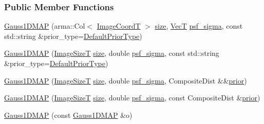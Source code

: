 \subsubsection*{Public Member Functions}
\begin{DoxyCompactItemize}
\item 
\hyperlink{classmappel_1_1Gauss1DMAP_adc8315bd2896d39cd11627555ce81ffa}{Gauss1\+D\+M\+AP} (arma\+::\+Col$<$ \hyperlink{classmappel_1_1ImageFormat1DBase_a82ab3168eb1a87eaeb3e7c919188e9fc}{Image\+CoordT} $>$ \hyperlink{classmappel_1_1ImageFormat1DBase_a8941b4d028e4dd881146a7c1b9039bb1}{size}, \hyperlink{namespacemappel_a2225ad69f358daa3f4f99282a35b9a3a}{VecT} \hyperlink{classmappel_1_1Gauss1DModel_a62c6b2a5d8ab5f5596504a19daed66b2}{psf\+\_\+sigma}, const std\+::string \&prior\+\_\+type=\hyperlink{classmappel_1_1Gauss1DModel_a4186ce131a5cc9a451ecc0011e4e6682}{Default\+Prior\+Type})
\item 
\hyperlink{classmappel_1_1Gauss1DMAP_a9284ca87695b215ee09c5fdd2d0ebcfe}{Gauss1\+D\+M\+AP} (\hyperlink{classmappel_1_1ImageFormat1DBase_a6456bab2b26702022ee32ae19e90dcac}{Image\+SizeT} \hyperlink{classmappel_1_1ImageFormat1DBase_a8941b4d028e4dd881146a7c1b9039bb1}{size}, double \hyperlink{classmappel_1_1Gauss1DModel_a62c6b2a5d8ab5f5596504a19daed66b2}{psf\+\_\+sigma}, const std\+::string \&prior\+\_\+type=\hyperlink{classmappel_1_1Gauss1DModel_a4186ce131a5cc9a451ecc0011e4e6682}{Default\+Prior\+Type})
\item 
\hyperlink{classmappel_1_1Gauss1DMAP_a9b85c2d282329d3f838754ee5c7917d8}{Gauss1\+D\+M\+AP} (\hyperlink{classmappel_1_1ImageFormat1DBase_a6456bab2b26702022ee32ae19e90dcac}{Image\+SizeT} \hyperlink{classmappel_1_1ImageFormat1DBase_a8941b4d028e4dd881146a7c1b9039bb1}{size}, double \hyperlink{classmappel_1_1Gauss1DModel_a62c6b2a5d8ab5f5596504a19daed66b2}{psf\+\_\+sigma}, Composite\+Dist \&\&\hyperlink{classmappel_1_1PointEmitterModel_a393839f8eb1dd3d61c9369377742ba0e}{prior})
\item 
\hyperlink{classmappel_1_1Gauss1DMAP_a9adcd4efe308c8b5e58d8aa5753664a8}{Gauss1\+D\+M\+AP} (\hyperlink{classmappel_1_1ImageFormat1DBase_a6456bab2b26702022ee32ae19e90dcac}{Image\+SizeT} \hyperlink{classmappel_1_1ImageFormat1DBase_a8941b4d028e4dd881146a7c1b9039bb1}{size}, double \hyperlink{classmappel_1_1Gauss1DModel_a62c6b2a5d8ab5f5596504a19daed66b2}{psf\+\_\+sigma}, const Composite\+Dist \&\hyperlink{classmappel_1_1PointEmitterModel_a393839f8eb1dd3d61c9369377742ba0e}{prior})
\item 
\hyperlink{classmappel_1_1Gauss1DMAP_a74a1d670191fec450870e3e904e84b82}{Gauss1\+D\+M\+AP} (const \hyperlink{classmappel_1_1Gauss1DMAP}{Gauss1\+D\+M\+AP} \&o)

\end{DoxyCompactItemize}

